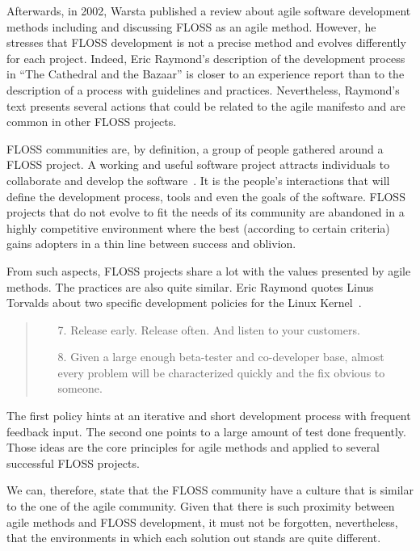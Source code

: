 \documentclass[lnbip]{svmultln}
\begin{document}
Afterwards, in 2002, Warsta \cite{warsta2002} published a review about
agile software development methods including and discussing FLOSS as
an agile method.  However, he stresses that FLOSS development is not a
precise method and evolves differently for each project. Indeed, Eric
Raymond's description of the development process in ``The Cathedral
and the Bazaar'' \cite{raymond1999} is closer to an experience report
than to the description of a process with guidelines and
practices. Nevertheless, Raymond's text presents several actions that
could be related to the agile manifesto \cite{url:agilemanifesto} and
are common in other FLOSS projects.

FLOSS communities are, by definition, a group of people gathered
around a FLOSS project. A working and useful software project attracts
individuals to collaborate and develop the
software~\cite{crowston2002}. It is the people's interactions that
will define the development process, tools and even the goals of the
software. FLOSS projects that do not evolve to fit the needs of its
community are abandoned in a highly competitive environment where the
best (according to certain criteria) gains adopters in a thin line
between success and oblivion.

From such aspects, FLOSS projects share a lot with the values
presented by agile methods. The practices are also quite similar. Eric
Raymond quotes Linus Torvalds about two specific development policies
for the Linux Kernel~\cite{raymond1999}.
\begin{quote}
  \begin{enumerate}
  \item[7.] Release early. Release often. And listen to your
    customers.
  \item[8.] Given a large enough beta-tester and co-developer base,
    almost every problem will be characterized quickly and the fix
    obvious to someone.
  \end{enumerate}
\end{quote}

The first policy hints at an iterative and short development process
with frequent feedback input. The second one points to a large amount
of test done frequently. Those ideas are the core principles for agile
methods and applied to several successful FLOSS projects.

We can, therefore, state that the FLOSS community have a culture that
is similar to the one of the agile community. Given that there is such
proximity between agile methods and FLOSS development, it must not be
forgotten, nevertheless, that the environments in which each solution
out stands are quite different.
\end{document}
